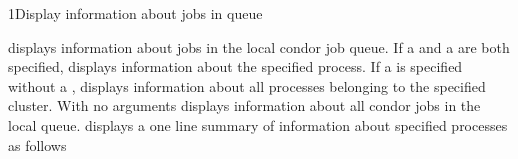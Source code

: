 \begin{ManPage}{}{1}{Display information about jobs in queue}
\label{man-condor-q}
\Synopsis {}
  
  
  

\Description
{} displays information about jobs in the local condor job queue.
If a  and a  are both specified, 
displays information about the specified process. If a  is
specified without a ,  displays information about
all processes belonging to the specified cluster. With no arguments
 displays information about all condor jobs in the local queue.
 displays a one line summary of information about specified
processes as follows

\begin{Options}

\end{Options}

\end{ManPage}
